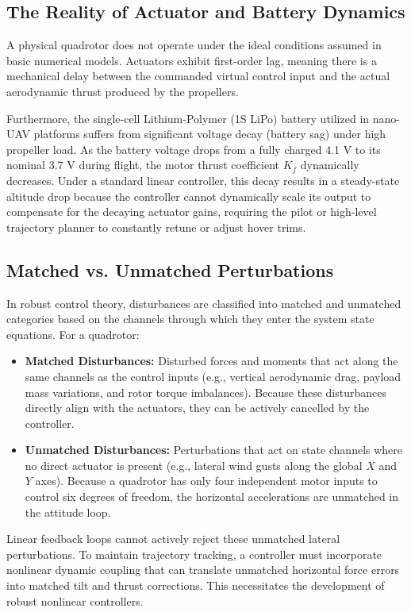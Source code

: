 \subsection{The Reality of Actuator and Battery Dynamics}
A physical quadrotor does not operate under the ideal conditions assumed in basic numerical models. Actuators exhibit first-order lag, meaning there is a mechanical delay between the commanded virtual control input and the actual aerodynamic thrust produced by the propellers. 

Furthermore, the single-cell Lithium-Polymer (1S LiPo) battery utilized in nano-UAV platforms suffers from significant voltage decay (battery sag) under high propeller load. As the battery voltage drops from a fully charged 4.1 V to its nominal 3.7 V during flight, the motor thrust coefficient $K_f$ dynamically decreases. Under a standard linear controller, this decay results in a steady-state altitude drop because the controller cannot dynamically scale its output to compensate for the decaying actuator gains, requiring the pilot or high-level trajectory planner to constantly retune or adjust hover trims.

\subsection{Matched vs. Unmatched Perturbations}
In robust control theory, disturbances are classified into matched and unmatched categories based on the channels through which they enter the system state equations. For a quadrotor:
\begin{itemize}
    \item \textbf{Matched Disturbances:} Disturbed forces and moments that act along the same channels as the control inputs (e.g., vertical aerodynamic drag, payload mass variations, and rotor torque imbalances). Because these disturbances directly align with the actuators, they can be actively cancelled by the controller.
    \item \textbf{Unmatched Disturbances:} Perturbations that act on state channels where no direct actuator is present (e.g., lateral wind gusts along the global $X$ and $Y$ axes). Because a quadrotor has only four independent motor inputs to control six degrees of freedom, the horizontal accelerations are unmatched in the attitude loop. 
\end{itemize}
Linear feedback loops cannot actively reject these unmatched lateral perturbations. To maintain trajectory tracking, a controller must incorporate nonlinear dynamic coupling that can translate unmatched horizontal force errors into matched tilt and thrust corrections. This necessitates the development of robust nonlinear controllers.

